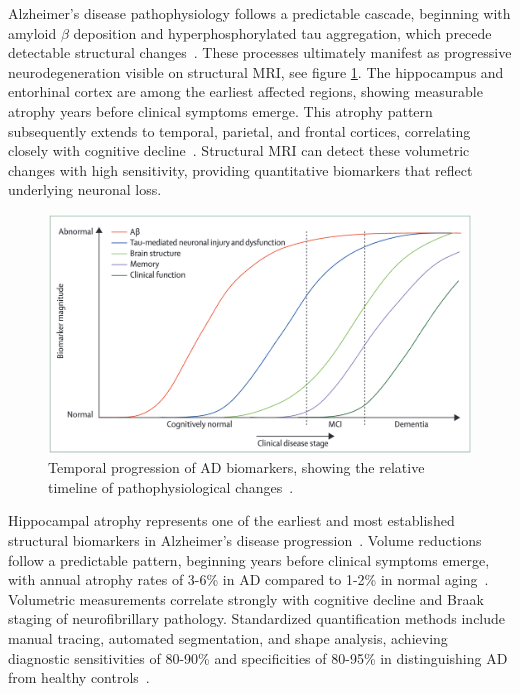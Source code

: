 \documentclass[11pt, a4paper]{article}
\begin{document}
Alzheimer's disease pathophysiology follows a predictable cascade, beginning with amyloid $\beta$ deposition and hyperphosphorylated tau aggregation, which precede detectable structural changes~\cite{jack2013tracking}. These processes ultimately manifest as progressive neurodegeneration visible on structural MRI, see figure \ref{fig:biomarker_progression}. The hippocampus and entorhinal cortex are among the earliest affected regions, showing measurable atrophy years before clinical symptoms emerge. This atrophy pattern subsequently extends to temporal, parietal, and frontal cortices, correlating closely with cognitive decline~\cite{vemuri2010role}. Structural MRI can detect these volumetric changes with high sensitivity, providing quantitative biomarkers that reflect underlying neuronal loss.

\begin{figure}[htbp]
  \centering
  \includegraphics[width=\textwidth]{figures/biomarkers.png}
  \caption{Temporal progression of AD biomarkers, showing the relative timeline of pathophysiological changes~\cite{jack2013tracking}.}
  \label{fig:biomarker_progression}
\end{figure}

Hippocampal atrophy represents one of the earliest and most established structural biomarkers in Alzheimer's disease progression~\cite{jack1992mr}. Volume reductions follow a predictable pattern, beginning years before clinical symptoms emerge, with annual atrophy rates of 3-6\% in AD compared to 1-2\% in normal aging~\cite{vemuri2010role}. Volumetric measurements correlate strongly with cognitive decline and Braak staging of neurofibrillary pathology. Standardized quantification methods include manual tracing, automated segmentation, and shape analysis, achieving diagnostic sensitivities of 80-90\% and specificities of 80-95\% in distinguishing AD from healthy controls~\cite{cuingnet2011automatic}.
\end{document}
